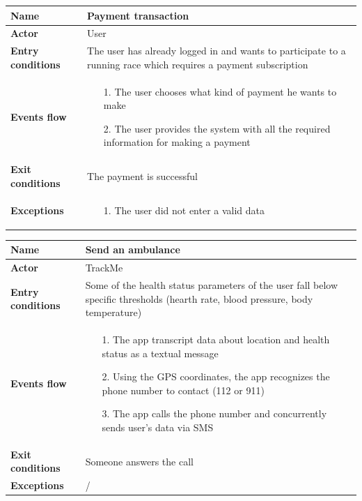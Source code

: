 \begin{table}[]
\begin{adjustbox}{width=\textwidth}
\footnotesize
\begin{tabular}{|p{}|p{}|}
\hline
\textbf{Name}             &  Payment transaction\\ \hline
\textbf{Actor}            &  User\\ \hline
\textbf{Entry conditions} &  The user has already logged in and wants to participate to a running race which requires a payment subscription\\ \hline
\textbf{Events flow}      &
	\begin{itemize}
		\item[1.] The user chooses what kind of payment he wants to make
		\item[2.] The user provides the system with all the required information for making a 	payment
	\end{itemize}\\ \hline
\textbf{Exit conditions}  &  The payment is successful\\ \hline
\textbf{Exceptions}       &
	\begin{itemize}
		\item[1.] The user did not enter a valid data
	\end{itemize}\\ \hline
\end{tabular}
\end{adjustbox}
\end{table}

\begin{table}[]
\begin{adjustbox}{width=\textwidth}
\footnotesize
\begin{tabular}{|p{}|p{}|}
\hline
\textbf{Name}             &  Send an ambulance\\ \hline
\textbf{Actor}            &  TrackMe\\ \hline
\textbf{Entry conditions} &  Some of the health status parameters of the user fall below specific thresholds (hearth rate, blood pressure, body temperature)\\ \hline
\textbf{Events flow}      &
	\begin{itemize}
		\item[1.] The app transcript data about location and health status as a textual message
		\item[2.] Using the GPS coordinates, the app recognizes the phone number to contact (112 or 911)
		\item[3.] The app calls the phone number and concurrently sends user's data via SMS
	\end{itemize}\\ \hline
\textbf{Exit conditions}  &  Someone answers the call\\ \hline
\textbf{Exceptions}       &  /\\ \hline
\end{tabular}
\end{adjustbox}
\end{table}

